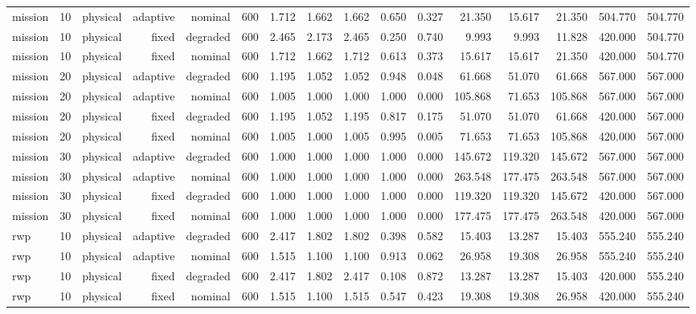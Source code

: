 \begin{tabular}{lrrrrrrrrrrrrrrr}
mission & 10 & physical & adaptive & nominal & 600 & 1.712 & 1.662 & 1.662 & 0.650 & 0.327 & 21.350 & 15.617 & 21.350 & 504.770 & 504.770 \\
mission & 10 & physical & fixed & degraded & 600 & 2.465 & 2.173 & 2.465 & 0.250 & 0.740 & 9.993 & 9.993 & 11.828 & 420.000 & 504.770 \\
mission & 10 & physical & fixed & nominal & 600 & 1.712 & 1.662 & 1.712 & 0.613 & 0.373 & 15.617 & 15.617 & 21.350 & 420.000 & 504.770 \\
mission & 20 & physical & adaptive & degraded & 600 & 1.195 & 1.052 & 1.052 & 0.948 & 0.048 & 61.668 & 51.070 & 61.668 & 567.000 & 567.000 \\
mission & 20 & physical & adaptive & nominal & 600 & 1.005 & 1.000 & 1.000 & 1.000 & 0.000 & 105.868 & 71.653 & 105.868 & 567.000 & 567.000 \\
mission & 20 & physical & fixed & degraded & 600 & 1.195 & 1.052 & 1.195 & 0.817 & 0.175 & 51.070 & 51.070 & 61.668 & 420.000 & 567.000 \\
mission & 20 & physical & fixed & nominal & 600 & 1.005 & 1.000 & 1.005 & 0.995 & 0.005 & 71.653 & 71.653 & 105.868 & 420.000 & 567.000 \\
mission & 30 & physical & adaptive & degraded & 600 & 1.000 & 1.000 & 1.000 & 1.000 & 0.000 & 145.672 & 119.320 & 145.672 & 567.000 & 567.000 \\
mission & 30 & physical & adaptive & nominal & 600 & 1.000 & 1.000 & 1.000 & 1.000 & 0.000 & 263.548 & 177.475 & 263.548 & 567.000 & 567.000 \\
mission & 30 & physical & fixed & degraded & 600 & 1.000 & 1.000 & 1.000 & 1.000 & 0.000 & 119.320 & 119.320 & 145.672 & 420.000 & 567.000 \\
mission & 30 & physical & fixed & nominal & 600 & 1.000 & 1.000 & 1.000 & 1.000 & 0.000 & 177.475 & 177.475 & 263.548 & 420.000 & 567.000 \\
rwp & 10 & physical & adaptive & degraded & 600 & 2.417 & 1.802 & 1.802 & 0.398 & 0.582 & 15.403 & 13.287 & 15.403 & 555.240 & 555.240 \\
rwp & 10 & physical & adaptive & nominal & 600 & 1.515 & 1.100 & 1.100 & 0.913 & 0.062 & 26.958 & 19.308 & 26.958 & 555.240 & 555.240 \\
rwp & 10 & physical & fixed & degraded & 600 & 2.417 & 1.802 & 2.417 & 0.108 & 0.872 & 13.287 & 13.287 & 15.403 & 420.000 & 555.240 \\
rwp & 10 & physical & fixed & nominal & 600 & 1.515 & 1.100 & 1.515 & 0.547 & 0.423 & 19.308 & 19.308 & 26.958 & 420.000 & 555.240 \\

\end{tabular}
